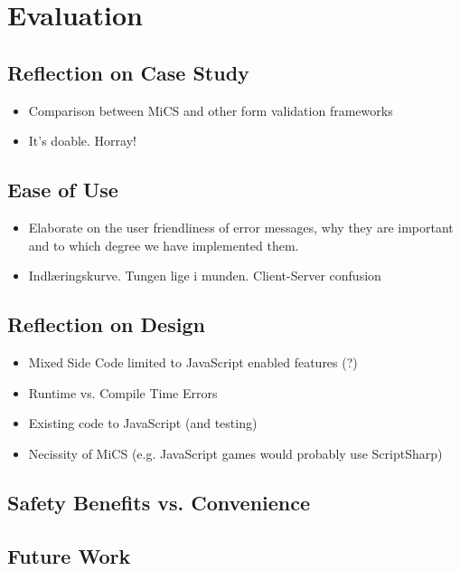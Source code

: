 \chapter{Evaluation}

\section{Reflection on Case Study} %
\label{sec:reflection_on_case_study}
	\begin{itemize}
		\item Comparison between MiCS and other form validation frameworks
		\item It's doable. Horray!
	\end{itemize}

\section{Ease of Use} %
\label{sec:ease_of_use}

	\begin{itemize}
		\item Elaborate on the user friendliness of error messages, why they are important
		and to which degree we have implemented them.
		\item Indlæringskurve. Tungen lige i munden. Client-Server confusion
	\end{itemize}


\section{Reflection on Design} %
\label{sec:reflection_on_design_goals}
	\begin{itemize}
		\item Mixed Side Code limited to JavaScript enabled features (?)
		\item Runtime vs. Compile Time Errors
		\item Existing code to JavaScript (and testing)
		\item Necissity of MiCS (e.g. JavaScript games would probably use ScriptSharp)
	\end{itemize}



\section{Safety Benefits vs. Convenience} %
\label{sec:safety_benefits_vs_conveniente}


\section{Future Work}